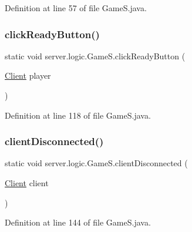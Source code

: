 Definition at line 57 of file Game\+S.\+java.

\hypertarget{classserver_1_1logic_1_1_game_s_ae6ab66ec3722750bbff9fdaeb6f0ea07}{}\label{classserver_1_1logic_1_1_game_s_ae6ab66ec3722750bbff9fdaeb6f0ea07} 
\subsubsection{\texorpdfstring{click\+Ready\+Button()}{clickReadyButton()}}
{\footnotesize\ttfamily static void server.\+logic.\+Game\+S.\+click\+Ready\+Button (\begin{DoxyParamCaption}\item[{\hyperlink{classserver_1_1conn_1_1_client}{Client}}]{player }\end{DoxyParamCaption})\hspace{0.3cm}{\ttfamily [static]}}



Definition at line 118 of file Game\+S.\+java.

\hypertarget{classserver_1_1logic_1_1_game_s_a84e3aec73f199ebdac03d69e5a73a364}{}\label{classserver_1_1logic_1_1_game_s_a84e3aec73f199ebdac03d69e5a73a364} 
\subsubsection{\texorpdfstring{client\+Disconnected()}{clientDisconnected()}}
{\footnotesize\ttfamily static void server.\+logic.\+Game\+S.\+client\+Disconnected (\begin{DoxyParamCaption}\item[{\hyperlink{classserver_1_1conn_1_1_client}{Client}}]{client }\end{DoxyParamCaption})\hspace{0.3cm}{\ttfamily [static]}}



Definition at line 144 of file Game\+S.\+java.

\hypertarget{classserver_1_1logic_1_1_game_s_a5ad22688c4bb480a7252f7b92fc6d1e2}{}\label{classserver_1_1logic_1_1_game_s_a5ad22688c4bb480a7252f7b92fc6d1e2} 
